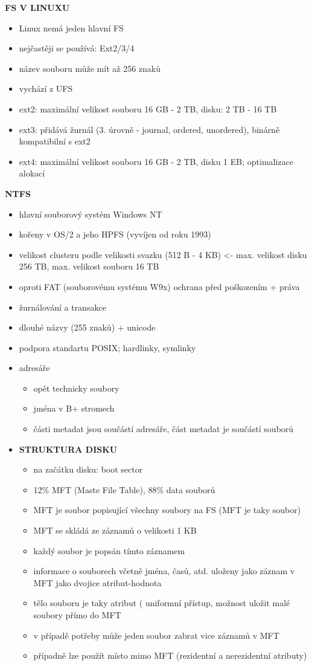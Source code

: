 \documentclass[10pt,a4paper]{article}
\begin{document}
\textbf{FS V LINUXU}
\begin{itemize}
	\item Linux nemá jeden hlavní FS
	\item nejčastěji se používá: Ext2/3/4
	\item název souboru může mít až 256 znaků
	\item vychází z UFS
	\item ext2: maximální velikost souboru 16 GB - 2 TB, disku: 2 TB - 16 TB
	\item ext3: přidává žurnál (3. úrovně - journal, ordered, unordered), binárně kompatibilní s ext2
	\item ext4: maximální velikost souboru 16 GB - 2 TB, disku 1 EB; optimalizace alokací
\end{itemize}

\textbf{NTFS}
\begin{itemize}
	\item hlavní souborový systém Windows NT
	\item kořeny v OS/2 a jeho HPFS (vyvíjen od roku 1993)
	\item velikost clusteru podle velikosti svazku (512 B - 4 KB) <- max. velikost disku 256 TB, max.
velikost souboru 16 TB
	\item oproti FAT (souborovému systému W9x) ochrana před poškozením + práva
	\item žurnálování a transakce
	\item dlouhé názvy (255 znaků) + unicode
	\item podpora standartu POSIX; hardlinky, symlinky
	\item adresáře
	\begin{itemize}
		\item opět technicky soubory
		\item jména v B+ stromech
		\item části metadat jsou součástí adresáře, část metadat je součástí souborů
	\end{itemize}
	\item \textbf{STRUKTURA DISKU}
	\begin{itemize}
		\item na začátku disku: boot sector
		\item 12\% MFT (Maste File Table), 88\% data souborů
		\item MFT je soubor popisující všechny soubory na FS (MFT je taky soubor)
		\item MFT se skládá ze záznamů o velikosti 1 KB
		\item každý soubor je popsán tímto záznamem
		\item informace o souborech včetně jména, časů, atd. uloženy jako záznam v MFT jako dvojice
atribut-hodnota
		\item tělo souboru je taky atribut ( uniformní přístup, možnost uložit malé soubory přímo do
MFT
		\item v případě potřeby může jeden soubor zabrat vice záznamů v MFT
		\item případně lze použít místo mimo MFT (rezidentní a nerezidentní atributy)
	\end{itemize}
\end{itemize}
\end{document}
